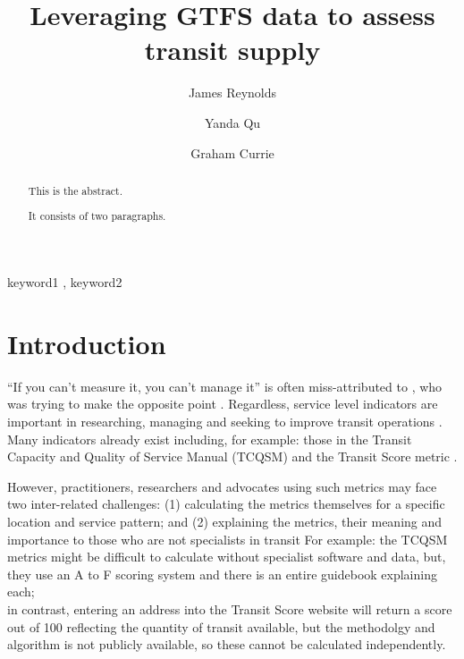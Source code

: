 \documentclass[preprint, 3p,
authoryear]{elsarticle} %
\begin{document}
\begin{frontmatter}

  \title{Leveraging GTFS data to assess transit supply}
    \author[Public Transport Research Group (PTRG)]{James Reynolds%
  }
    \author[Public Transport Research Group (PTRG)]{Yanda Qu%
  }
    \author[Public Transport Research Group (PTRG)]{Graham Currie%
  }
  
  \begin{abstract}
  This is the abstract.

  It consists of two paragraphs.
  \end{abstract}
    \begin{keyword}
    keyword1 \sep 
    keyword2
  \end{keyword}
  
 \end{frontmatter}

\hypertarget{introduction}{%
\section{Introduction}\label{introduction}}

``If you can't measure it, you can't manage it'' is often
miss-attributed to \citet{Deming1993new}, who was trying to make the
opposite point \citep{Berenson2016in}. Regardless, service level
indicators are important in researching, managing and seeking to improve
transit operations \citep{FieldingGordonJ1987Mpts, Ryus:2003aa}. Many
indicators already exist including, for example: those in the Transit
Capacity and Quality of Service Manual (TCQSM)\citep{TCQSM:2013} and the
Transit Score metric \citep{WalkScore:2023tg}.

However, practitioners, researchers and advocates using such metrics may
face two inter-related challenges: (1) calculating the metrics
themselves for a specific location and service pattern; and (2)
explaining the metrics, their meaning and importance to those who are
not specialists in transit For example: the TCQSM metrics might be
difficult to calculate without specialist software and data, but, they
use an A to F scoring system and there is an entire guidebook explaining
each;\\
in contrast, entering an address into the Transit Score website will
return a score out of 100 reflecting the quantity of transit available,
but the methodolgy and algorithm is not publicly available, so these
cannot be calculated independently.
\end{document}

